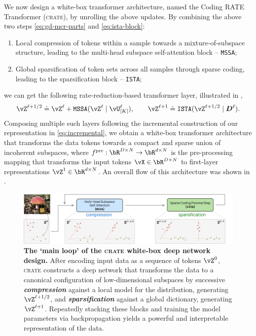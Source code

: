 \documentclass[../../book-main.tex]{subfiles}
\begin{document}
We now design a white-box transformer architecture, named the Coding RATE Transformer (\textsc{crate}), by unrolling the above updates. By combining the above two steps \eqref{eq:gd-mcr-parts} and \eqref{eq:ista-block}:
\begin{enumerate}[leftmargin=0.7cm]
    \item Local compression of tokens within a sample towards a mixture-of-subspace structure, leading to the multi-head subspace self-attention block -- \texttt{MSSA};
    \item Global sparsification of token sets across all samples through sparse coding, leading to the sparsification block -- \texttt{ISTA};
\end{enumerate}
we can get the following rate-reduction-based transformer layer, illustrated in , 
\begin{equation}
    \vZ^{\ell+1/2} \doteq \vZ^{\ell} + \texttt{MSSA}(\vZ^{\ell} \mid \vU_{[K]}^{\ell}), 
    \qquad 
    \vZ^{\ell+1}\doteq \texttt{ISTA}(\vZ^{\ell+1/2} \mid \bm D^\ell).
\end{equation}
Composing multiple such layers following the incremental construction of our representation in \eqref{eq:incremental}, we obtain a white-box transformer architecture that transforms the data tokens towards a compact and sparse union of incoherent subspaces, where $f^{\pre}: \bR^{D \times N} \rightarrow \bR^{d \times N}$ is the pre-processing mapping that transforms the input tokens $\vX \in \bR^{D \times N}$ to first-layer representations $\vZ^{1} \in \bR^{d \times N}$. An overall flow of this architecture was shown in .

\begin{figure}[t!]
     \centering
         \includegraphics[width=\textwidth]{figs_chap4/CRATE_fig1_patches.pdf}
     \vspace{-0.1in}
     \caption{
     \textbf{The `main loop' of the \textsc{crate} white-box deep network design.} 
     After encoding input data as a sequence of tokens $\vZ^0$, \textsc{crate} constructs a deep network that transforms the data to a canonical configuration of low-dimensional subspaces by successive   {\textit{\textbf{compression}}} 
     against a local model for the distribution, generating $\vZ^{\ell+1/2}$, and      {\textit{\textbf{sparsification}}} 
     against a global dictionary, generating $\vZ^{\ell+1}$. 
     Repeatedly stacking these blocks and training the model parameters via backpropagation yields a powerful and interpretable representation of the data.
     }
        \label{fig:crate-diagram}
\end{figure}
\end{document}
